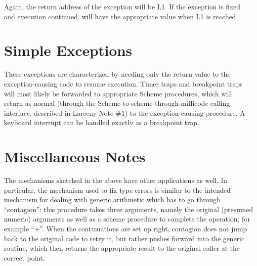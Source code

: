 Again, the return address of the exception will be L1. If the exception is
fixed and execution continued,  will have the appropriate
value when L1 is reached.

\section{Simple Exceptions}

These exceptions are characterized by needing only the return value to
the exception-causing code to resume execution. Timer traps and
breakpoint traps will most likely be forwarded to appropriate Scheme
procedures, which will return as normal (through the
Scheme-to-scheme-through-millicode calling interface, described in
Larceny Note \#1) to the exception-causing procedure. A keyboard
interrupt can be handled exactly as a breakpoint trap.

\section{Miscellaneous Notes}

The mechanisms sketched in the above have other applications as well.
In particular, the mechanism used to fix type errors is similar to the
intended mechanism for dealing with generic arithmetic which has to go
through ``contagion'': this procedure takes three arguments, namely
the original (presumed numeric) arguments as well as a scheme
procedure to complete the operation, for example ``+''. When the
continuations are set up right, contagion does not jump back to the
original code to retry it, but rather pushes forward into the generic
routine, which then returns the appropriate result to the original
caller at the correct point.



